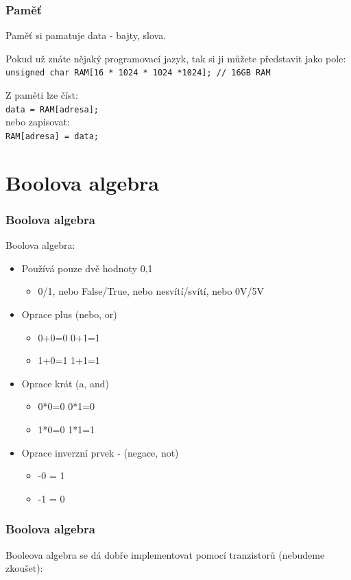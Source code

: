 \documentclass{beamer}
\begin{document}
\begin{frame}
\frametitle{Paměť}

Paměť si pamatuje data - bajty, slova.

Pokud už znáte nějaký programovací jazyk, tak si ji můžete představit jako pole:\\
\texttt{unsigned char RAM[16 * 1024 * 1024 *1024]; // 16GB RAM}

\bigskip
Z paměti lze číst:\\
\texttt{data = RAM[adresa];}\\
nebo zapisovat:\\
\texttt{RAM[adresa] = data;}

\end{frame}

\section{Boolova algebra}
\begin{frame}
\frametitle{Boolova algebra}

Boolova algebra:
\begin{itemize}
\item Používá pouze dvě hodnoty 0,1
\begin{itemize}
\item 0/1, nebo False/True, nebo nesvítí/svítí, nebo 0V/5V
\end{itemize}
\item Oprace plus (nebo, or)
\begin{itemize}
\item 0+0=0   0+1=1
\item 1+0=1   1+1=1
\end{itemize}
\item Oprace krát (a, and)
\begin{itemize}
\item 0*0=0   0*1=0
\item 1*0=0   1*1=1
\end{itemize}
\item Oprace inverzní prvek - (negace, not)
\begin{itemize}
\item -0 = 1
\item -1 = 0
\end{itemize}
\end{itemize}
\end{frame}


\begin{frame}
\frametitle{Boolova algebra}

Booleova algebra se dá dobře implementovat pomocí tranzistorů (nebudeme zkoušet):

\end{frame}
\end{document}
